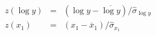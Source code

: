 \documentclass[varwidth=\linewidth]{standalone}
\begin{document}
$$\begin{aligned}
z(\log y) &=& (\log y - \overline{\log y}) / \hat{\sigma}_{\log y} \\
z(x_1) &=& (x_1 - \overline{x}_1) / \hat{\sigma}_{x_1} \\
\end{aligned}$$
\end{document}
